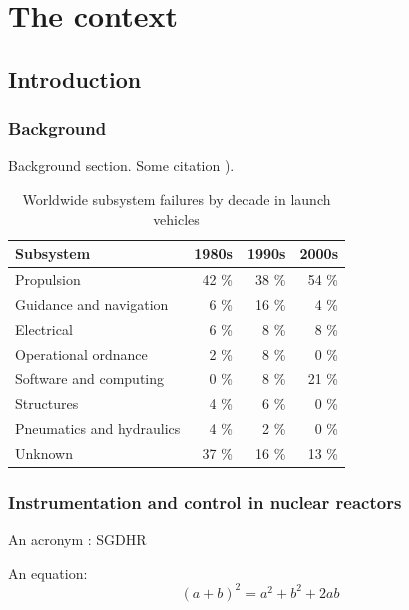 \setcounter{page}{0}

\part{The context}
\chapter{{Introduction}}
\label{ch:Chapter-1}
\section{Background}
Background section. Some citation \cite{dev-launch-vehicles}).\\
\begin{table}[H]
\begin{centering}
\small{
\begin{tabular}{lrrr}
\toprule
{\bf Subsystem} & {\bf 1980s} & {\bf 1990s}&{\bf 2000s}\tabularnewline
\midrule
Propulsion & 42 \% & 38 \%&54 \%\tabularnewline
Guidance and navigation&6 \%&16 \%&4 \%\tabularnewline
Electrical&6 \%&8 \%&8 \%\tabularnewline
Operational ordnance&2 \%&8 \%&0 \%\tabularnewline
\rowcolor{Gray}
{Software and computing}&{0 \%}&{8 \%}&{21 \%}\tabularnewline
Structures&4 \%&6 \%&0 \%\tabularnewline
Pneumatics and hydraulics&4 \%&2 \%&0 \%\tabularnewline
Unknown&37 \%&16 \%&13 \%\tabularnewline
\bottomrule
\end{tabular}}
\caption{\label{tab:Worldwide}Worldwide subsystem failures by decade in launch vehicles}
\end{centering}
\end{table}

\section{Instrumentation and control in nuclear reactors}
An acronym : \ac{SGDHR}

An equation:
\begin{equation}
  (a + b )^2 = a^2 + b^2 + 2ab\label{eq:my equation}
\end{equation}

